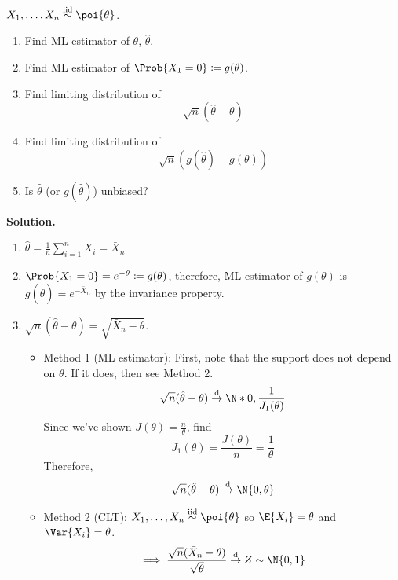 \begin{Example}{}{}
    $ X_1,\ldots,X_n \stackrel{\text{iid}}{\sim}\poi{\theta} $.
    \begin{enumerate}[label=(\roman*)]
        \item Find ML estimator of $ \theta $, $ \hat{\theta} $.
        \item Find ML estimator of $ \Prob{X_1=0}\coloneq g(\theta) $.
        \item Find limiting distribution of
              \[ \sqrt{n}(\hat{\theta}-\theta) \]
        \item Find limiting distribution of
              \[ \sqrt{n}(g(\hat{\theta})-g(\theta)) \]
        \item Is $ \hat{\theta} $ (or $ g(\hat{\theta}) $) unbiased?
    \end{enumerate}
    \textbf{Solution.}
    \begin{enumerate}[label=(\roman*)]
        \item $ \displaystyle \hat{\theta}=\frac{1}{n}\sum_{i=1}^{n} X_i=\bar{X}_n $
        \item $ \Prob{X_1=0}=e^{-\theta}\coloneq g(\theta) $,
              therefore, ML estimator of $ g(\theta) $ is $ g(\hat{\theta})=e^{-\bar{X}_n} $
              by the invariance property.
        \item $ \sqrt{n}(\hat{\theta}-\theta)=\sqrt{\bar{X}_n-\theta} $.
              \begin{itemize}
                  \item Method 1 (ML estimator): First, note that
                        the support does not depend on $ \theta $. If it does,
                        then see Method 2.
                        \[ \sqrt{n}(\hat{\theta}-\theta)\stackrel{\text{d}}{\to}
                            \N*{0,\frac{1}{J_1(\theta)} } \]
                        Since we've shown $ J(\theta)=\frac{n}{\theta} $, find
                        \[ J_1(\theta)=\frac{J(\theta)}{n}=\frac{1}{\theta} \]
                        Therefore,
                        \[  \sqrt{n}(\hat{\theta}-\theta)\stackrel{\text{d}}{\to}
                            \N{0,\theta} \]
                  \item Method 2 (CLT): $ X_1,\ldots,X_n\stackrel{\text{iid}}{\sim}\poi{\theta} $
                        so $ \E{X_i}=\theta $ and $ \Var{X_i}=\theta $.
                        \[ \implies \frac{\sqrt{n}(\bar{X}_n-\theta)}{\sqrt{\theta}}
                            \stackrel{\text{d}}{\to}Z \sim \N{0,1}  \]

\end{itemize}
\end{enumerate}
\end{Example}
